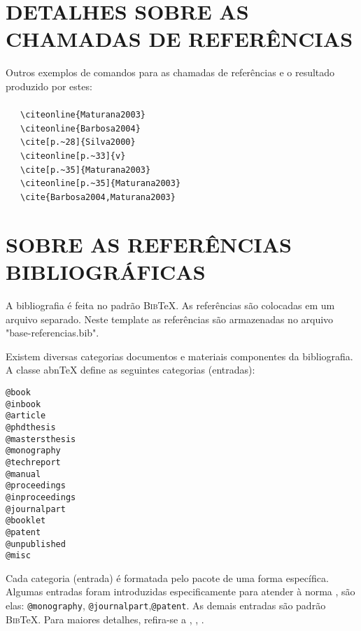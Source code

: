 \chapter{DETALHES SOBRE AS CHAMADAS DE REFERÊNCIAS}
\label{chap:referUtilizadas}

Outros exemplos de comandos para as chamadas de referências e o resultado produzido por estes:\\
\\ \ \ \  \verb|\citeonline{Maturana2003}|\\
 \ \ \   \verb|\citeonline{Barbosa2004}|\\
\cite[p.~28]{Silva2000} \ \ \  \verb|\cite[p.~28]{Silva2000}|\\
 \ \ \   \verb|\citeonline[p.~33]{v}|\\
\cite[p.~35]{Maturana2003} \ \ \   \verb|\cite[p.~35]{Maturana2003}|\\
 \ \ \   \verb|\citeonline[p.~35]{Maturana2003}|\\
\cite{Barbosa2004,Maturana2003} \ \ \   \verb|\cite{Barbosa2004,Maturana2003}|\\

\chapter{SOBRE AS REFERÊNCIAS BIBLIOGRÁFICAS}
\label{chap:apSobreRefer}

A bibliografia é feita no padrão \textsc{Bib}\TeX{}. As referências são colocadas em um arquivo separado. Neste template as referências são armazenadas no arquivo "base-referencias.bib".

Existem diversas categorias documentos e materiais componentes da bibliografia. A classe abn\TeX{} define as seguintes categorias (entradas):

\begin{verbatim}
@book
@inbook
@article
@phdthesis
@mastersthesis
@monography
@techreport
@manual
@proceedings
@inproceedings
@journalpart
@booklet
@patent
@unpublished
@misc
\end{verbatim}

Cada categoria (entrada) é formatada pelo pacote  de uma forma específica. Algumas entradas foram introduzidas especificamente para atender à norma , são elas: \verb|@monography|, \verb|@journalpart|,\verb|@patent|. As demais entradas são padrão \textsc{Bib}\TeX{}. Para maiores detalhes, refira-se a , , .


